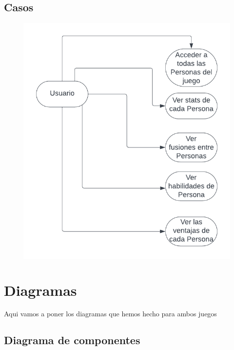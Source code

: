 \documentclass[a4paper,twoside,10pt]{report}
\begin{document}
\newpage

\section{Casos}

\begin{figure}[htbp]
	\centering
		\includegraphics[width=1.00\textwidth]{Personacasos.png}
	\label{fig:Personacasos}
\end{figure}

\chapter{Diagramas}

\par Aqui vamos a poner los diagramas que hemos hecho para ambos juegos

\section{Diagrama de componentes}
\end{document}
